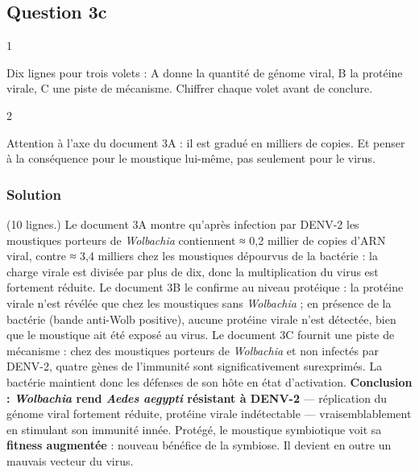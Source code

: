 \documentclass[11pt,a4paper]{article}
\begin{document}
\hypertarget{question-3c}{%
\subsection{Question 3c}\label{question-3c}}

\begin{indication}{1}

Dix lignes pour trois volets : A donne la quantité de génome viral, B la protéine virale, C une piste de mécanisme. Chiffrer chaque volet avant de conclure.

\end{indication}

\begin{indication}{2}

Attention à l'axe du document 3A : il est gradué en milliers de copies. Et penser à la conséquence pour le moustique lui-même, pas seulement pour le virus.

\end{indication}

\hypertarget{solution-48}{%
\subsubsection{Solution}\label{solution-48}}

(10 lignes.) Le document 3A montre qu'après infection par DENV-2 les moustiques porteurs de \emph{Wolbachia} contiennent ≈ 0,2 millier de copies d'ARN viral, contre ≈ 3,4 milliers chez les moustiques dépourvus de la bactérie : la charge virale est divisée par plus de dix, donc la multiplication du virus est fortement réduite. Le document 3B le confirme au niveau protéique : la protéine virale n'est révélée que chez les moustiques sans \emph{Wolbachia} ; en présence de la bactérie (bande anti-Wolb positive), aucune protéine virale n'est détectée, bien que le moustique ait été exposé au virus. Le document 3C fournit une piste de mécanisme : chez des moustiques porteurs de \emph{Wolbachia} et non infectés par DENV-2, quatre gènes de l'immunité sont significativement surexprimés. La bactérie maintient donc les défenses de son hôte en état d'activation. \textbf{Conclusion : \emph{Wolbachia} rend \emph{Aedes aegypti} résistant à DENV-2} --- réplication du génome viral fortement réduite, protéine virale indétectable --- vraisemblablement en stimulant son immunité innée. Protégé, le moustique symbiotique voit sa \textbf{fitness augmentée} : nouveau bénéfice de la symbiose. Il devient en outre un mauvais vecteur du virus.
\end{document}

